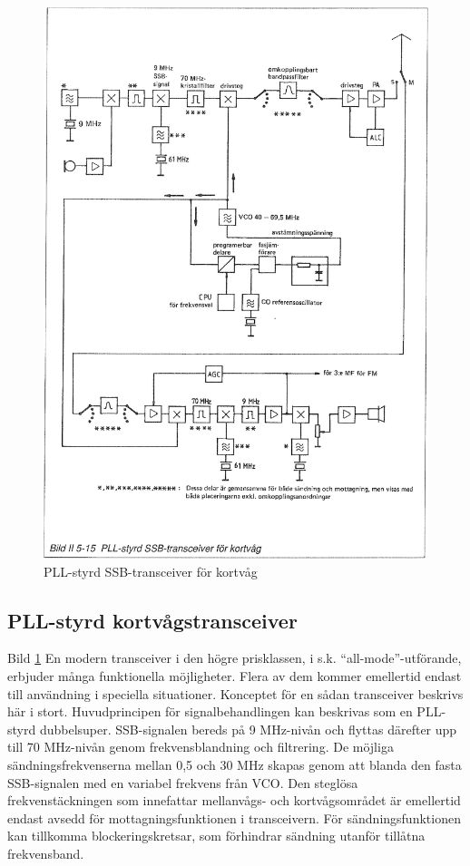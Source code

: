\begin{figure}
  \includegraphics[width=\textwidth]{images/bild_2_5-15}
  \caption{PLL-styrd SSB-transceiver för kortvåg}
  \label{fig:bildII5-15}
\end{figure}

\subsection{PLL-styrd kortvågstransceiver}

Bild \ref{fig:bildII5-15} En modern transceiver i den högre prisklassen, i
s.k. ``all-mode''-utförande, erbjuder många funktionella
möjligheter. Flera av dem kommer emellertid endast till användning i
speciella situationer. Konceptet för en sådan transceiver beskrivs här
i stort.  Huvudprincipen för signalbehandlingen kan beskrivas som en
PLL-styrd dubbelsuper.  SSB-signalen bereds på 9 MHz-nivån och flyttas
därefter upp till 70 MHz-nivån genom frekvensblandning och
filtrering. De möjliga sändningsfrekvenserna mellan 0,5 och 30 MHz
skapas genom att blanda den fasta SSB-signalen med en variabel
frekvens från VCO. Den steglösa frekvenstäckningen som innefattar
mellanvågs- och kortvågsområdet är emellertid endast avsedd för
mottagningsfunktionen i transceivern. För sändningsfunktionen kan
tillkomma blockeringskretsar, som förhindrar sändning utanför tillåtna
frekvensband.


